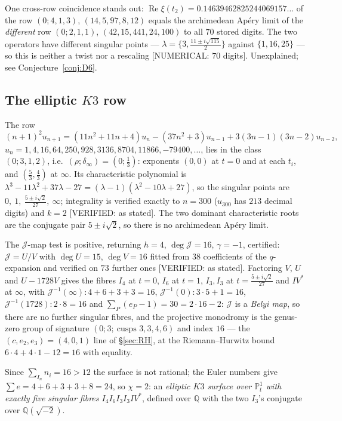 \documentclass[11pt,reqno]{amsart}
\theoremstyle{plain}
\theoremstyle{definition}
\theoremstyle{remark}
\theoremstyle{plain}
\newcommand{\Q}{\mathbb{Q}}
\newcommand{\PP}{\mathbb{P}}
\DeclareMathOperator{\re}{Re}
\newcommand{\Jm}{\mathcal J}
\newcommand{\Verified}[1]{\textup{\textsf{[VERIFIED: #1]}}}
\newcommand{\Numerical}[1]{\textup{\textsf{[NUMERICAL: #1]}}}
\begin{document}
One cross-row coincidence stands out: $\re\xi(t_2)=0.14639462825244069157\dots$
of the row $(0;4,1,3)$, $(14,5,97,8,12)$ equals the archimedean Ap\'ery limit of
the \emph{different} row $(0;2,1,1)$, $(42,15,441,24,100)$ to all $70$ stored
digits. The two operators have different singular points ---
$\lambda=\{3,\tfrac{11\pm i\sqrt{115}}2\}$ against $\{1,16,25\}$ --- so this is
neither a twist nor a rescaling \Numerical{$70$ digits}. Unexplained; see
Conjecture~\ref{conj:D6}.

\subsection{The elliptic $K3$ row}\label{sec:k3}
The row
\begin{equation}\label{eq:k3row}
(n+1)^2u_{n+1}=(11n^2+11n+4)u_n-(37n^2+3)u_{n-1}+3(3n-1)(3n-2)u_{n-2},
\end{equation}
$u_n=1,4,16,64,250,928,3136,8704,11866,-79400,\dots$, lies in the class
$(0;3,1,2)$, i.e.\ $(\rho;\delta_\infty)=(0;\tfrac13)$: exponents $(0,0)$ at
$t=0$ and at each $t_i$, and $(\tfrac53,\tfrac43)$ at $\infty$. Its
characteristic polynomial is
$\lambda^3-11\lambda^2+37\lambda-27=(\lambda-1)(\lambda^2-10\lambda+27)$, so the
singular points are $0,\ 1,\ \tfrac{5\pm i\sqrt2}{27},\ \infty$; integrality is
verified exactly to $n=300$ ($u_{300}$ has $213$ decimal digits) and $k=2$
\Verified{as stated}. The two dominant characteristic roots are the conjugate
pair $5\pm i\sqrt2$, so there is no archimedean Ap\'ery limit.

The $\Jm$-map test is positive, returning $h=4$, $\deg\Jm=16$, $\gamma=-1$,
certified: $\Jm=U/V$ with $\deg U=15$, $\deg V=16$ fitted from $38$ coefficients
of the $q$-expansion and verified on $73$ further ones \Verified{as stated}.
Factoring $V$, $U$ and $U-1728V$ gives the fibres $I_4$ at $t=0$, $I_6$ at $t=1$,
$I_3,I_3$ at $t=\tfrac{5\pm i\sqrt2}{27}$ and $IV^*$ at $\infty$, with
$\Jm^{-1}(\infty):4+6+3+3=16$, $\Jm^{-1}(0):3\cdot5+1=16$,
$\Jm^{-1}(1728):2\cdot8=16$ and $\sum_P(e_P-1)=30=2\cdot16-2$: $\Jm$ is a
\emph{Belyi map}, so there are no further singular fibres, and the projective
monodromy is the genus-zero group of signature $(0;3;\ \text{cusps }3,3,4,6)$ and
index $16$ --- the $(c,e_2,e_3)=(4,0,1)$ line of \S\ref{sec:RH}, at the
Riemann--Hurwitz bound $6\cdot4+4\cdot1-12=16$ with equality.

Since $\sum_{I_n}n_i=16>12$ the surface is not rational; the Euler numbers give
$\sum e=4+6+3+3+8=24$, so $\chi=2$: an \emph{elliptic $K3$ surface over
$\PP^1_t$ with exactly five singular fibres $I_4I_6I_3I_3IV^*$}, defined over
$\Q$ with the two $I_3$'s conjugate over $\Q(\sqrt{-2})$.
\end{document}
